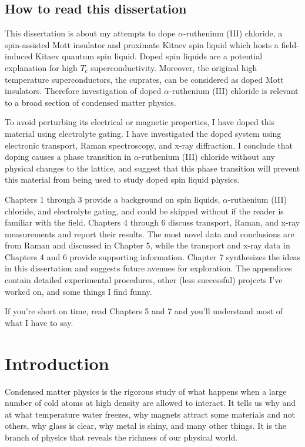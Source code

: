 \section*{How to read this dissertation}

This dissertation is about my attempts to dope $\alpha$-ruthenium (III) chloride, a spin-assisted Mott insulator and proximate Kitaev spin liquid which hosts a field-induced Kitaev quantum spin liquid. Doped spin liquids are a potential explanation for high $T_{c}$ superconductivity. Moreover, the original high temperature superconductors, the cuprates, can be considered as doped Mott insulators. Therefore investigation of doped $\alpha$-ruthenium (III) chloride is relevant to a broad section of condensed matter physics.

To avoid perturbing its electrical or magnetic properties, I have doped this material using electrolyte gating. I have investigated the doped system using electronic transport, Raman spectroscopy, and x-ray diffraction. I conclude that doping causes a phase transition in $\alpha$-ruthenium (III) chloride without any physical changes to the lattice, and suggest that this phase transition will prevent this material from being used to study doped spin liquid physics.

Chapters 1 through 3 provide a background on spin liquids, $\alpha$-ruthenium (III) chloride, and electrolyte gating, and could be skipped without if the reader is familiar with the field. Chapters 4 through 6 discuss transport, Raman, and x-ray measurements and report their results. The most novel data and conclusions are from Raman and discussed in Chapter 5, while the transport and x-ray data in Chapters 4 and 6 provide supporting information. Chapter 7 synthesizes the ideas in this dissertation and suggests future avenues for exploration. The appendices contain detailed experimental procedures, other (less successful) projects I've worked on, and some things I find funny.

If you're short on time, read Chapters 5 and 7 and you'll understand most of what I have to say.

\chapter{Introduction}
Condensed matter physics is the rigorous study of what happens when a large number of cold atoms at high density are allowed to interact. It tells us why and at what temperature water freezes, why magnets attract some materials and not others, why glass is clear, why metal is shiny, and many other things. It is the branch of physics that reveals the richness of our physical world.

